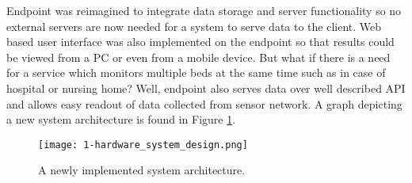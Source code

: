 Endpoint was reimagined to integrate data storage and server functionality so no external servers are now needed for a system to serve data to the client. Web based user interface was also implemented on the endpoint so that results could be viewed from a \ac{PC} or even from a mobile device. But what if there is a need for a service which monitors multiple beds at the same time such as in case of hospital or nursing home? Well, endpoint also serves data over well described API and allows easy readout of data collected from sensor network. A graph depicting a new system architecture is found in Figure \ref{fig:sys_architecture}.

\begin{figure}[h]
  \begin{center}
    \texttt{[image: 1-hardware\_system\_design.png]}
  \end{center}
  \caption{A newly implemented system architecture.}
  \label{fig:sys_architecture}
\end{figure}